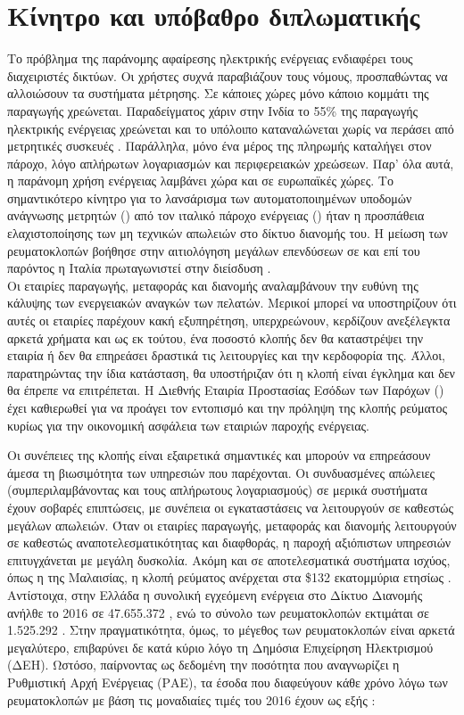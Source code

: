\section{Κίνητρο και υπόβαθρο διπλωματικής}
Το πρόβλημα της παράνομης αφαίρεσης ηλεκτρικής ενέργειας ενδιαφέρει τους διαχειριστές δικτύων. Οι χρήστες συχνά παραβιάζουν τους νόμους, προσπαθώντας να αλλοιώσουν τα συστήματα μέτρησης. Σε κάποιες χώρες μόνο κάποιο κομμάτι της παραγωγής χρεώνεται. Παραδείγματος χάριν στην Ινδία το 55\% της παραγωγής ηλεκτρικής ενέργειας χρεώνεται και το υπόλοιπο καταναλώνεται χωρίς να περάσει από μετρητικές συσκευές \cite{india}. Παράλληλα, μόνο ένα μέρος της πληρωμής καταλήγει στον πάροχο, λόγο απλήρωτων λογαριασμών και περιφερειακών χρεώσεων. Παρ' όλα αυτά, η παράνομη χρήση ενέργειας λαμβάνει χώρα και σε ευρωπαϊκές χώρες. Το σημαντικότερο κίνητρο για το λανσάρισμα των αυτοματοποιημένων υποδομών ανάγνωσης μετρητών () από τον ιταλικό πάροχο ενέργειας () ήταν η προσπάθεια ελαχιστοποίησης των μη τεχνικών απωλειών στο δίκτυο διανομής του. Η μείωση των ρευματοκλοπών βοήθησε στην αιτιολόγηση μεγάλων επενδύσεων σε  και επί του παρόντος η Ιταλία πρωταγωνιστεί στην διείσδυση  \cite{regulation}.\\ 
Οι εταιρίες παραγωγής, μεταφοράς και διανομής αναλαμβάνουν την ευθύνη της κάλυψης των ενεργειακών αναγκών των πελατών. Μερικοί μπορεί να υποστηρίζουν ότι αυτές οι εταιρίες παρέχουν κακή εξυπηρέτηση, υπερχρεώνουν, κερδίζουν ανεξέλεγκτα αρκετά χρήματα και ως εκ τούτου, ένα ποσοστό κλοπής δεν θα καταστρέψει την εταιρία ή δεν θα επηρεάσει δραστικά τις λειτουργίες και την κερδοφορία της. Άλλοι, παρατηρώντας την ίδια κατάσταση, θα υποστήριζαν ότι η κλοπή είναι έγκλημα και δεν θα έπρεπε να επιτρέπεται. Η Διεθνής Εταιρία Προστασίας Εσόδων των Παρόχων () έχει καθιερωθεί για να προάγει τον εντοπισμό και την πρόληψη της κλοπής ρεύματος κυρίως για την οικονομική ασφάλεια των εταιριών παροχής ενέργειας.\par
Οι συνέπειες της κλοπής είναι εξαιρετικά σημαντικές και μπορούν να επηρεάσουν άμεσα τη βιωσιμότητα των υπηρεσιών που παρέχονται. Οι συνδυασμένες απώλειες (συμπεριλαμβάνοντας και τους απλήρωτους λογαριασμούς) σε μερικά συστήματα έχουν σοβαρές επιπτώσεις, με συνέπεια οι εγκαταστάσεις να λειτουργούν σε καθεστώς μεγάλων απωλειών. Όταν οι εταιρίες παραγωγής, μεταφοράς και διανομής λειτουργούν σε καθεστώς αναποτελεσματικότητας και διαφθοράς, η παροχή αξιόπιστων υπηρεσιών επιτυγχάνεται με μεγάλη δυσκολία. Ακόμη και σε αποτελεσματικά συστήματα ισχύος, όπως η  της Μαλαισίας, η κλοπή ρεύματος ανέρχεται στα \$132 εκατομμύρια ετησίως \cite{malaysia}. Αντίστοιχα, στην Ελλάδα η συνολική εγχεόμενη ενέργεια στο Δίκτυο Διανομής ανήλθε το 2016 σε 47.655.372 , ενώ το σύνολο των ρευματοκλοπών εκτιμάται σε 1.525.292 . Στην πραγματικότητα, όμως, το μέγεθος των ρευματοκλοπών είναι αρκετά μεγαλύτερο, επιβαρύνει δε κατά κύριο λόγο τη Δημόσια Επιχείρηση Ηλεκτρισμού (ΔΕΗ). Ωστόσο, παίρνοντας ως δεδομένη την ποσότητα που αναγνωρίζει η Ρυθμιστική Αρχή Ενέργειας (ΡΑΕ), τα έσοδα που διαφεύγουν κάθε χρόνο λόγω των ρευματοκλοπών με βάση τις μοναδιαίες τιμές του 2016 έχουν ως εξής \cite{dehfraud}:

